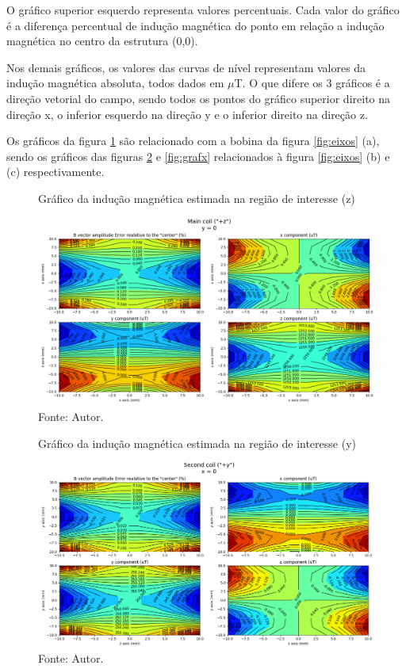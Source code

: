 O gráfico superior esquerdo representa valores percentuais. Cada valor do gráfico é a diferença percentual de indução magnética do ponto em relação a indução magnética no centro da estrutura (0,0).

Nos demais gráficos, os valores das curvas de nível representam valores da indução magnética absoluta, todos dados em $\mu$T. O que difere os 3 gráficos é a direção vetorial do campo, sendo todos os pontos do gráfico superior direito na direção x, o inferior esquerdo na direção y e o inferior direito na direção z.

Os gráficos da figura \ref{fig:grafz} são relacionado com a bobina da figura \ref{fig:eixos} (a), sendo os gráficos das figuras \ref{fig:grafy} e \ref{fig:grafx} relacionados à figura \ref{fig:eixos} (b) e (c) respectivamente.
    
\begin{figure}[H]
    \centering
     \caption{Gráfico da indução magnética estimada na região de interesse (z)}
     \includegraphics[width=1\textwidth]{./img/simulacao/mainCoilZ.png}
     \caption*{Fonte: Autor.}\label{fig:grafz}
\end{figure}


\begin{figure}[H]
    \centering
     \caption{Gráfico da indução magnética estimada na região de interesse (y)}
     \includegraphics[width=1\textwidth]{./img/simulacao/secondCoily.png}
     \caption*{Fonte: Autor.}\label{fig:grafy}
\end{figure}

